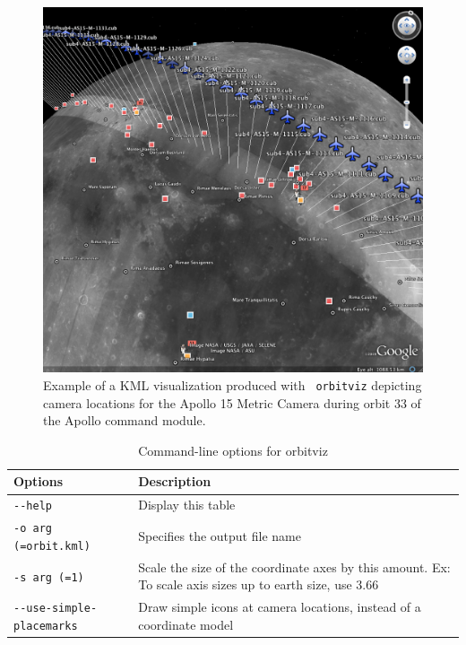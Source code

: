 \begin{figure}[ht]
  \begin{center}
  \includegraphics[width=6in]{images/orbitviz_ge_result.png}
  \end{center}
  \caption{ Example of a KML visualization produced with {\tt
      orbitviz} depicting camera locations for the Apollo 15 Metric
    Camera during orbit 33 of the Apollo command module.}
  \label{fig:orbitviz_example}
\end{figure}

\begin{longtable}{|l|p{10cm}|}
\caption{Command-line options for orbitviz}
\label{tbl:orbitviz}
\endfirsthead
\endhead
\endfoot
\endlastfoot
\hline
Options & Description \\ \hline \hline
\verb#--help# & Display this table \\ \hline
\verb#-o arg (=orbit.kml)# & Specifies the output file name \\ \hline
\verb#-s arg (=1)# & Scale the size of the coordinate axes by this amount. Ex: To scale axis sizes up to earth size, use 3.66 \\ \hline
\verb#--use-simple-placemarks# & Draw simple icons at camera locations, instead of a coordinate model \\ \hline
\end{longtable}


